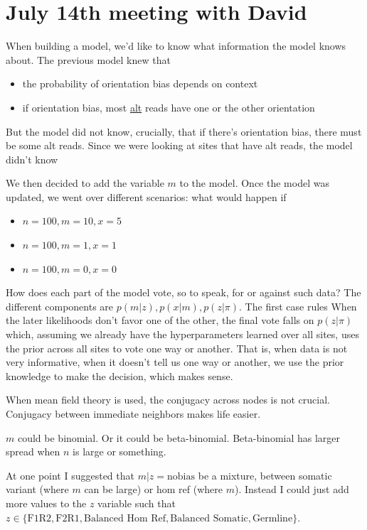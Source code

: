 \documentclass[a4paper]{article}
\begin{document}
\section{July 14th meeting with David}

When building a model, we'd like to know what information the model knows about. The previous model knew that 

\begin{itemize}
\item the probability of orientation bias depends on context
\item if orientation bias, most \underline{alt} reads have one or the other orientation
\end{itemize}

But the model did not know, crucially, that if there's orientation bias, there must be some alt reads. Since we were looking at sites that have alt reads, the model didn't know 

We then decided to add the variable $m$ to the model.  Once the model was updated, we went over different scenarios: what would happen if 
\begin{itemize}
\item $n = 100, m = 10, x = 5$ 
\item $n = 100, m = 1, x = 1$
\item $n = 100, m = 0, x = 0$
\end{itemize}

How does each part of the model vote, so to speak, for or against such data? The different components are $p(m|z), p(x|m), p(z | \pi)$. The first case rules 
When the later likelihoods don't favor one of the other, the final vote falls on $p(z | \pi)$ which, assuming we already have the hyperparameters learned over all sites, uses the prior across all sites to vote one way or another. That is, when data is not very informative, when it doesn't tell us one way or another, we use the prior knowledge to make the decision, which makes sense.

When mean field theory is used, the conjugacy across nodes is not crucial. Conjugacy between immediate neighbors makes life easier.

$m$ could be binomial. Or it could be beta-binomial. Beta-binomial has larger spread when $n$ is large or something. 

At one point I suggested that $m|z = \mathrm{no bias}$ be a mixture, between somatic variant (where $m$ can be large) or hom ref (where $m$). Instead I could just add more values to the $z$ variable such that $z \in \{ \text{F1R2}, \text{F2R1}, \text{Balanced Hom Ref}, \text{Balanced Somatic}, \text{Germline} \}$.
\end{document}

